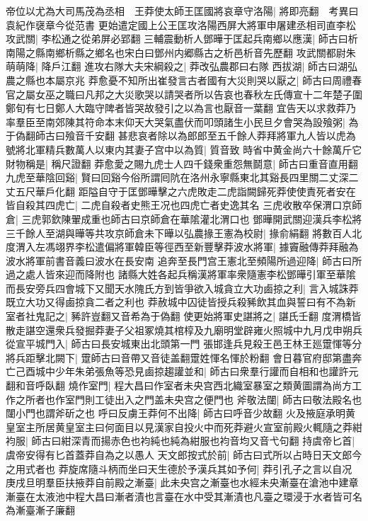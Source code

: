 帝位以尤為大司馬茂為丞相　王莽使太師王匡國將哀章守洛陽|{
	將即亮翻　考異曰袁紀作襃章今從范書}
更始遣定國上公王匡攻洛陽西屏大將軍申屠建丞相司直李松攻武關|{
	李松通之從弟屏必郢翻}
三輔震動析人鄧曄于匡起兵南鄉以應漢|{
	師古曰析南陽之縣南鄉析縣之鄉名也宋白曰鄧州内郷縣古之析邑析音先歷翻}
攻武關都尉朱萌萌降|{
	降戶江翻}
進攻右隊大夫宋綱殺之|{
	莽改弘農郡曰右隊}
西拔湖|{
	師古曰湖弘農之縣也本屬京兆}
莽愈憂不知所出崔發言古者國有大災則哭以厭之|{
	師古曰周禮春官之屬女巫之職曰凡邦之大災歌哭以請哭者所以告哀也春秋左氏傳宣十二年楚子圍鄭旬有七日鄭人大臨守陴者皆哭故發引之以為言也厭音一葉翻}
宜告天以求救莽乃率羣臣至南郊陳其符命本末仰天大哭氣盡伏而叩頭諸生小民旦夕會哭為設飱粥|{
	為于偽翻師古曰飱音千安翻}
甚悲哀者除以為郎郎至五千餘人莽拜將軍九人皆以虎為號將北軍精兵數萬人以東内其妻子宫中以為質|{
	質音致}
時省中黄金尚六十餘萬斤它財物稱是|{
	稱尺證翻}
莽愈愛之賜九虎士人四千錢衆重怨無鬬意|{
	師古曰重音直用翻}
九虎至華陰回谿|{
	賢曰回谿今俗所謂囘阬在洛州永寧縣東北其谿長四里關二丈深二丈五尺華戶化翻}
距隘自守于匡鄧曄擊之六虎敗走二虎詣闕歸死莽使使責死者安在皆自殺其四虎亡|{
	二虎自殺者史熊王况也四虎亡者史逸其名}
三虎收散卒保渭口京師倉|{
	三虎郭欽陳翬成重也師古曰京師倉在華隂灌北渭口也}
鄧曄開武關迎漢兵李松將三千餘人至湖與曄等共攻京師倉未下曄以弘農掾王憲為校尉|{
	掾俞絹翻}
將數百人北度渭入左馮翊界李松遣偏將軍韓臣等徑西至新豐擊莽波水將軍|{
	據竇融傳莽拜融為波水將軍前書音義曰波水在長安南}
追奔至長門宫王憲北至頻陽所過迎降|{
	師古曰所過之處人皆來迎而降附也}
諸縣大姓各起兵稱漢將軍率衆隨憲李松鄧曄引軍至華隂而長安旁兵四會城下又聞天水隗氏方到皆爭欲入城貪立大功鹵掠之利|{
	言入城誅莽既立大功又得鹵掠貪二者之利也}
莽赦城中囚徒皆授兵殺豨飲其血與誓曰有不為新室者社鬼記之|{
	豨許豈翻又音希為于偽翻}
使更始將軍史諶將之|{
	諶氏壬翻}
度渭橋皆散走諶空還衆兵發掘莽妻子父祖冢燒其棺椁及九廟明堂辟雍火照城中九月戊申朔兵從宣平城門入|{
	師古曰長安城東出北頭第一門}
張邯逢兵見殺王邑王林王廵䠠惲等分將兵距擊北闕下|{
	䠠師古曰音帶又音徒盖翻䠠姓惲名惲於粉翻}
會日暮官府邸第盡奔亡己酉城中少年朱弟張魚等恐見鹵掠趨讙並和|{
	師古曰衆羣行讙而自相和也讙許元翻和音呼臥翻}
燒作室門|{
	程大昌曰作室者未央宫西北織室暴室之類黄圖謂為尚方工作之所者也作室門則工徒出入之門盖未央宫之便門也}
斧敬法闥|{
	師古曰敬法殿名也闥小門也謂斧斫之也}
呼曰反虜王莽何不出降|{
	師古曰呼音少故翻}
火及掖庭承明黄皇室主所居黄皇室主曰何面目以見漢家自投火中而死莽避火宣室前殿火輒隨之莽紺袀服|{
	師古曰紺深青而揚赤色也袀純也純為紺服也袀音均又音弋句翻}
持虞帝匕首|{
	虞帝安得有匕首蓋莽自為之以愚人}
天文郎按式於前|{
	師古曰式所以占時日天文郎今之用式者也}
莽旋席隨斗柄而坐曰天生德於予漢兵其如予何|{
	莽引孔子之言以自况}
庚戌旦明羣臣扶掖莽自前殿之漸臺|{
	此未央宫之漸臺也水經未央漸臺在滄池中建章漸臺在太液池中程大昌曰漸者漬也言臺在水中受其漸漬也凡臺之環浸于水者皆可名為漸臺漸子廉翻}
